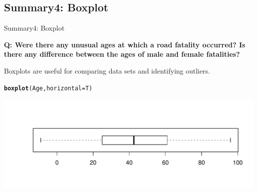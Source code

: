 \documentclass[t,xcolor=pdftex,dvipsnames,table]{beamer}\usepackage[]{graphicx}\usepackage[]{color}
\makeatletter
\def\maxwidth{ %
  \ifdim\Gin@nat@width>\linewidth
    \linewidth
  \else
    \Gin@nat@width
  \fi
}
\newcommand{\hlstd}[1]{\textcolor[rgb]{0.345,0.345,0.345}{#1}}%
\newcommand{\hlkwc}[1]{\textcolor[rgb]{0.333,0.667,0.333}{#1}}%
\newcommand{\hlkwd}[1]{\textcolor[rgb]{0.737,0.353,0.396}{\textbf{#1}}}%
\newenvironment{kframe}{%
 \def\at@end@of@kframe{}%
 \ifinner\ifhmode%
  \def\at@end@of@kframe{\end{minipage}}%
  \begin{minipage}{\columnwidth}%
 \fi\fi%
 \def\FrameCommand##1{\hskip\@totalleftmargin \hskip-\fboxsep
 \colorbox{shadecolor}{##1}\hskip-\fboxsep
     \hskip-\linewidth \hskip-\@totalleftmargin \hskip\columnwidth}%
 \MakeFramed {\advance\hsize-\width
   \@totalleftmargin\z@ \linewidth\hsize
   \@setminipage}}%
 {\par\unskip\endMakeFramed%
 \at@end@of@kframe}
\newenvironment{knitrout}{}{} %
\makeatother
\begin{document}
\subsection[]{Summary4: Boxplot}
\begin{frame}[fragile]{Summary4: Boxplot}

\vspace{.5cm}
{\bf Q: Were there any unusual ages at which a road fatality occurred? Is there any difference between the ages of male and female fatalities?}

\vspace{.5cm}
Boxplots are useful for comparing data sets and identifying outliers. 

\begin{knitrout}
\color{fgcolor}\begin{kframe}
\begin{alltt}
\hlkwd{boxplot}\hlstd{(Age,}\hlkwc{horizontal}\hlstd{=T)}
\end{alltt}
\end{kframe}
\includegraphics[width=\maxwidth]{figure/unnamed-chunk-14-1} 

\end{knitrout}
 
\end{frame}
\end{document}
